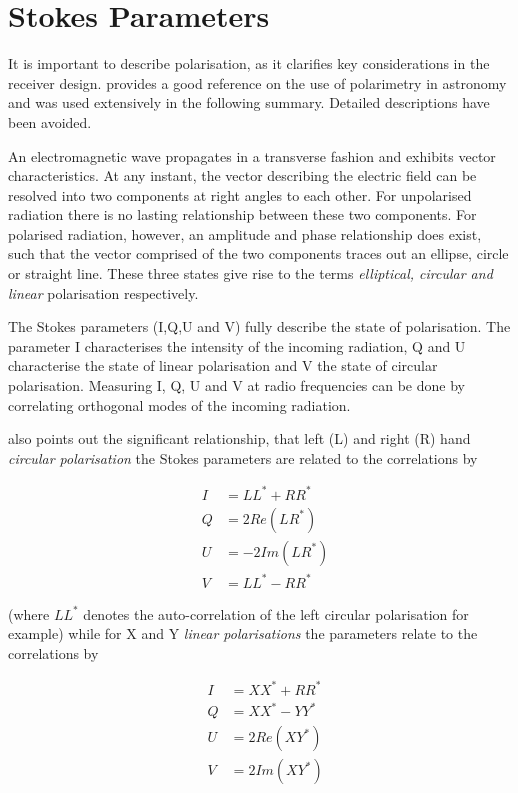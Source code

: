 
\section{Stokes Parameters}
\label{sec:stokes}

It is important to describe polarisation, as it clarifies key considerations in the receiver design. \citet{tinbergen_1996} provides a good reference on the use of polarimetry in astronomy and was used extensively in the following summary. Detailed descriptions have been avoided.

An electromagnetic wave propagates in a transverse fashion and exhibits vector characteristics. At any instant, the vector describing the electric field can be resolved into two components at right angles to each other. For unpolarised radiation there is no lasting relationship between these two components. For polarised radiation, however, an amplitude and phase relationship does exist, such that the vector comprised of the two components traces out an ellipse, circle or straight line. These three states give rise to the terms \textit{elliptical, circular and linear} polarisation respectively.  

The Stokes parameters (I,Q,U and V) fully describe the state of polarisation. The parameter I characterises the intensity of the incoming radiation, Q and U characterise the state of linear polarisation and V the state of circular polarisation. Measuring I, Q, U and V at radio frequencies can be done by correlating orthogonal modes of the incoming radiation. 

 also points out the significant relationship, that left (L) and right (R) hand \textit{circular polarisation} the Stokes parameters are related to the correlations by 

\begin{eqnarray}
& I &= LL^{*} + RR^{*}  \label{eq:stokes_circ_I} \\
& Q &= 2Re(LR^{*}) \label{eq:stokes_circ_Q}\\
& U &= -2Im(LR^{*}) \label{eq:stokes_circ_U}\\
& V &= LL^{*}-RR^{*} \label{eq:stokes_circ_V}
\label{eq:stokes_circ}
\end{eqnarray} 

(where $LL^{*}$ denotes the auto-correlation of the left circular polarisation for example) while for X and Y \textit{linear polarisations} the parameters relate to the correlations by


\begin{eqnarray}
& I &= XX^{*} + RR^{*} \label{eq:stokes_lin_I} \\ 
& Q &= XX^{*} - YY^{*} \label{eq:stokes_lin_Q}\\
& U &= 2Re(XY^{*}) \label{eq:stokes_lin_U}\\
& V &= 2Im(XY^{*}) \label{eq:stokes_lin_V}
\label{eq:stokes_lin}
\end{eqnarray} 

